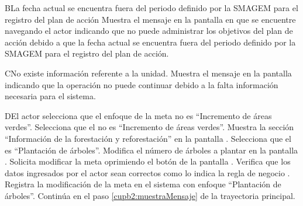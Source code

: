    \begin{UCtrayectoriaA}{B}{La fecha actual se encuentra fuera del periodo definido por la SMAGEM para el registro del plan de acción}
    \UCpaso[\UCsist] Muestra el mensaje  en la pantalla en que se encuentre navegando el actor indicando que no puede administrar los objetivos del plan de acción debido a que la fecha actual se encuentra fuera del periodo definido por la SMAGEM para el registro del plan de acción.
 \end{UCtrayectoriaA}


\begin{UCtrayectoriaA}{C}{No existe información referente a la unidad.}
	\UCpaso[\UCsist] Muestra el mensaje  en la pantalla  indicando que la operación no puede continuar debido a la falta información necesaria para el sistema.
\end{UCtrayectoriaA}

\begin{UCtrayectoriaA}{D}{El actor selecciona que el enfoque de la meta no es ``Incremento de áreas verdes''.}
	\UCpaso[\UCactor] Selecciona que el  no es ``Incremento de áreas verdes''. 
	\UCpaso[\UCsist] Muestra la sección ``Información de la forestación y reforestación'' en la pantalla .
	\UCpaso[\UCactor] Selecciona que el  es ``Plantación de árboles''. 
	\UCpaso[\UCactor] Modifica el número de árboles a plantar en la pantalla .
	\UCpaso[\UCactor] Solicita modificar la meta oprimiendo el botón  de la pantalla .  
	\UCpaso[\UCsist] Verifica que los datos ingresados por el actor sean correctos como lo indica la regla de negocio .   
	\UCpaso[\UCsist] Registra la modificación de la meta en el sistema con enfoque ``Plantación de árboles''.
	\UCpaso[] Continúa en el paso \ref{cupb2:muestraMensaje} de la trayectoria principal.
\end{UCtrayectoriaA}

